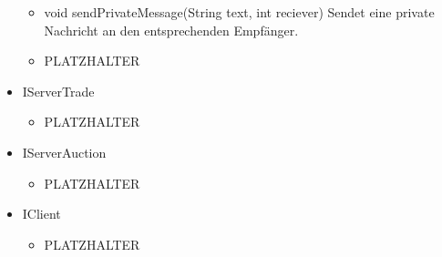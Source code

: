 \documentclass[a4paper,10pt]{article}
\begin{document}
\begin{itemize}
\begin{itemize}
\item void sendPrivateMessage(String text, int reciever)
Sendet eine private Nachricht an den entsprechenden Empfänger.
\end{itemize}
\begin{itemize}
\item PLATZHALTER
\end{itemize}
\item IServerTrade
\begin{itemize}
\item PLATZHALTER
\end{itemize}
\item IServerAuction
\begin{itemize}
\item PLATZHALTER
\end{itemize}
\item IClient
\begin{itemize}
\item PLATZHALTER
\end{itemize}
\end{itemize} %
\end{document}
